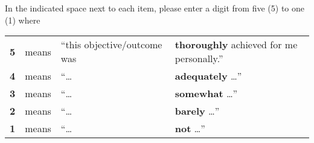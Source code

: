 \documentclass[handout]{mcs}
\begin{document}
In the indicated space next to each item, please enter a digit from five
(5) to one (1) where

\begin{center}
\begin{tabular}{rcll}
\hline
\textbf{5} & means &  ``this objective/outcome was & \textbf{thoroughly}
achieved for me personally.''\\
\textbf{4} & means &  ``\dots & \textbf{adequately} \dots''\\
\textbf{3} & means &  ``\dots & \textbf{somewhat} \dots''\\
\textbf{2} & means &  ``\dots & \textbf{barely} \dots''\\
\textbf{1} & means &  ``\dots & \textbf{not} \dots''\\
\hline
\end{tabular}
\end{center}
\fi
\end{document}
